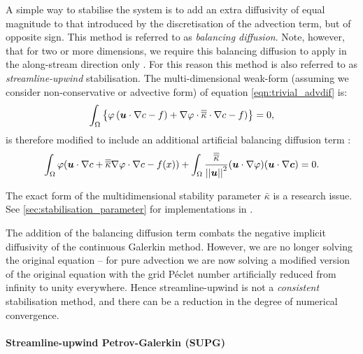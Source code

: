 A simple way to stabilise the system is to add an extra diffusivity of
equal magnitude to that introduced by the discretisation of the advection term,
but of opposite sign. This method is referred to as \textit{balancing diffusion}.
Note, however, that for two or more dimensions, we require this balancing
diffusion to apply in the along-stream direction only \citep{brooks1982, DoneaBook}.
For this reason this method is also referred to as \textit{streamline-upwind}
stabilisation. The multi-dimensional weak-form (assuming we consider non-conservative or advective form) 
of equation \eqref{eqn:trivial_advdif} is:
\begin{equation}\label{eqn:trivial_advdif_weak_md}
  \int_\Omega \left\{ \varphi \left({\mbox{\boldmath$u$}} \cdot \nabla c -f \right)+ \nabla \varphi \cdot \overline{\overline{\kappa}}  \cdot \nabla c -f)\right\} = 0,
\end{equation}
is therefore modified to include an additional artificial balancing diffusion
term \citep{DoneaBook}:
\begin{equation}\label{eqn:balancing_diffusion}
  \int_\Omega \varphi ({\mbox{\boldmath$u$}} \cdot \nabla c + \overline{\overline{\kappa}} \nabla \varphi \cdot \nabla c - f(x)) +
  \int_\Omega \frac{\overline{\overline{\kappa}}}{\left|\left| {\mbox{\boldmath$u$}} \right|\right|^2}
  ({\mbox{\boldmath$u$}} \cdot \nabla \varphi) ({\mbox{\boldmath$u$}} \cdot \nabla {\mbox{\boldmath$c$}})
  = 0.
\end{equation}

The exact form of the multidimensional stability parameter $\bar{\kappa}$
is a research issue. See \ref{sec:stabilisation_parameter} for implementations in
\fluidity.

The addition of the balancing diffusion term combats the negative implicit
diffusivity of the continuous Galerkin method. However, we are no longer solving
the original equation -- for pure advection we are now solving a modified
version of the original equation with the grid
P\'eclet number artificially reduced from
infinity to unity everywhere. Hence streamline-upwind is not a \textit{consistent}
stabilisation method, and there can be a reduction in the degree of numerical
convergence.

\paragraph{Streamline-upwind Petrov-Galerkin (SUPG)}\label{sec:supg}

